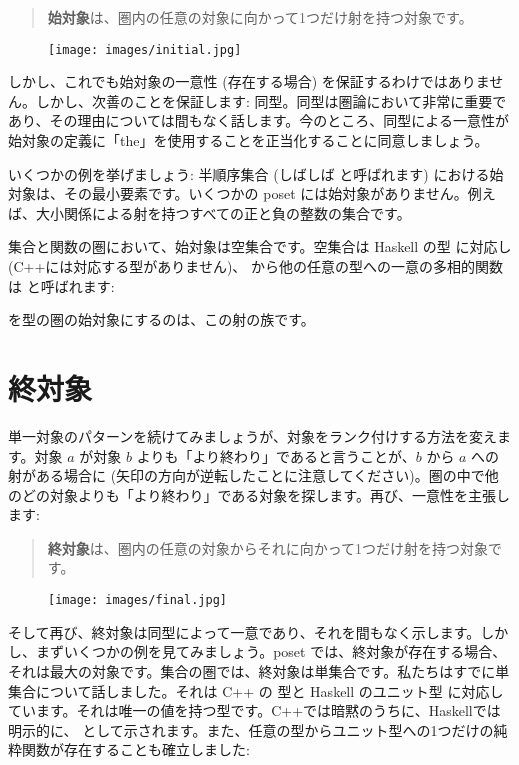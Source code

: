 \begin{quote}
  \textbf{始対象}は、圏内の任意の対象に向かって1つだけ射を持つ対象です。
\end{quote}

\begin{figure}[H]
  \centering
  \texttt{[image: images/initial.jpg]}
\end{figure}

\noindent
しかし、これでも始対象の一意性 (存在する場合) を保証するわけではありません。しかし、次善のことを保証します: 同型。同型は圏論において非常に重要であり、その理由については間もなく話します。今のところ、同型による一意性が始対象の定義に「the」を使用することを正当化することに同意しましょう。

いくつかの例を挙げましょう: 半順序集合 (しばしば  と呼ばれます) における始対象は、その最小要素です。いくつかの poset には始対象がありません。例えば、大小関係による射を持つすべての正と負の整数の集合です。

集合と関数の圏において、始対象は空集合です。空集合は Haskell の型  に対応し (C++には対応する型がありません)、 から他の任意の型への一意の多相的関数は  と呼ばれます:

 を型の圏の始対象にするのは、この射の族です。

\section{終対象}

単一対象のパターンを続けてみましょうが、対象をランク付けする方法を変えます。対象 $a$ が対象 $b$ よりも「より終わり」であると言うことが、$b$ から $a$ への射がある場合に (矢印の方向が逆転したことに注意してください)。圏の中で他のどの対象よりも「より終わり」である対象を探します。再び、一意性を主張します:

\begin{quote}
  \textbf{終対象}は、圏内の任意の対象からそれに向かって1つだけ射を持つ対象です。
\end{quote}

\begin{figure}[H]
  \centering
  \texttt{[image: images/final.jpg]}
\end{figure}

\noindent
そして再び、終対象は同型によって一意であり、それを間もなく示します。しかし、まずいくつかの例を見てみましょう。poset では、終対象が存在する場合、それは最大の対象です。集合の圏では、終対象は単集合です。私たちはすでに単集合について話しました。それは C++ の  型と Haskell のユニット型 \code{()} に対応しています。それは唯一の値を持つ型です。C++では暗黙のうちに、Haskellでは明示的に、\code{()} として示されます。また、任意の型からユニット型への1つだけの純粋関数が存在することも確立しました:

